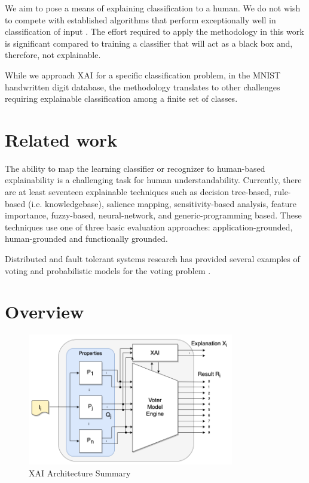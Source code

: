\documentclass[conference]{IEEEtran}
\begin{document}
We aim to pose a means of explaining classification to a human.  We do not wish to compete with established algorithms that perform exceptionally well in classification of input \cite{keysers07} \cite{lecun98} \cite{schm2012}.  The effort required to apply the methodology in this work is significant compared to training a classifier that will act as a black box and, therefore, not explainable.

While we approach XAI for a specific classification problem, in the MNIST handwritten digit database, the methodology translates to other challenges requiring explainable classification among a finite set of classes.

\section{Related work}

The ability to map the learning classifier or recognizer to human-based explainability is a challenging task for human understandability.  Currently, there are at least seventeen explainable techniques such as
decision tree-based, rule-based (i.e. knowledgebase), salience mapping,
sensitivity-based analysis, feature importance, fuzzy-based, neural-network, and generic-programming based.  These techniques use one of three basic evaluation approaches: application-grounded, human-grounded and functionally grounded. \cite{BlackBox18} \cite{Arrieta2020ExplainableAI} \cite{Survey18} \cite{Fuzzy19} \cite{Hagras18}  \cite{GP18}

Distributed and fault tolerant systems research has provided several examples of voting \cite{avizienis} and probabilistic models for the voting problem \cite{blough}.

\section{Overview}

 \begin{figure}[htbp]
\centerline{\includegraphics[width=90mm]{./images/voting_prop_nn_2.png}}
\caption{XAI Architecture Summary}
\label{voting}
\end{figure}
\end{document}
